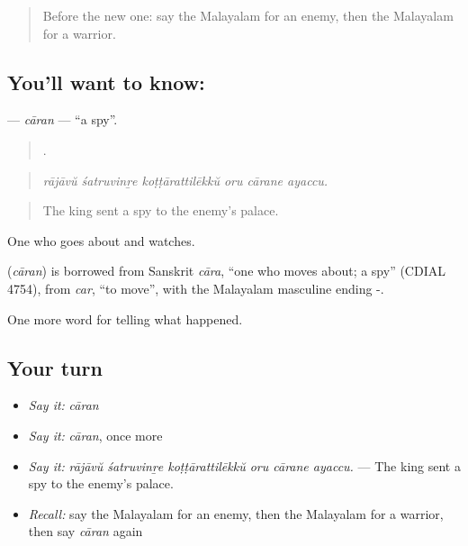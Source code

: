 \label{lesson:ML-C400-caran}



\begin{quote}
Before the new one: say the Malayalam for an enemy, then the Malayalam for a warrior.
\end{quote}

\subsection*{You'll want to know: }
\textbf{} — \emph{cāran} — \textquotedblleft{}a spy\textquotedblright{}.

\begin{quote}
     .
\end{quote}

\begin{quote}
\emph{rājāvŭ śatruvinṟe koṭṭārattilēkkŭ oru cārane ayaccu.}
\end{quote}

\begin{quote}
The king sent a spy to the enemy's palace.
\end{quote}

One who goes about and watches.

\begin{cousinweb}
\textbf{} (\emph{cāran}) is borrowed from Sanskrit \emph{cāra}, \textquotedblleft{}one who moves about; a spy\textquotedblright{} (CDIAL 4754), from \emph{car}, \textquotedblleft{}to move\textquotedblright{}, with the Malayalam masculine ending -.
\end{cousinweb}

\begin{grammarlens}[title={What you've built}]
One more word for telling what happened.
\end{grammarlens}

\subsection*{Your turn}
\begin{itemize}
\raggedright
  \item \emph{Say it:} \emph{cāran}
  \item \emph{Say it:} \emph{cāran}, once more
  \item \emph{Say it:} \emph{rājāvŭ śatruvinṟe koṭṭārattilēkkŭ oru cārane ayaccu.} — The king sent a spy to the enemy's palace.
  \item \emph{Recall:} say the Malayalam for an enemy, then the Malayalam for a warrior, then say \emph{cāran} again
\end{itemize}

